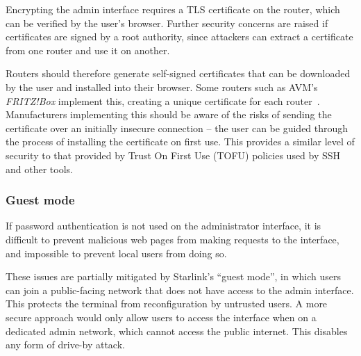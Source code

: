 Encrypting the admin interface requires a TLS certificate on the router, which can be verified by the user's browser.
Further security concerns are raised if certificates are signed by a root authority, since attackers can extract a certificate from one router and use it on another.

Routers should therefore generate self-signed certificates that can be downloaded by the user and installed into their browser.
Some routers such as AVM's \textit{FRITZ!Box} implement this, creating a unique certificate for each router~\cite{fritzbox_cert}.
Manufacturers implementing this should be aware of the risks of sending the certificate over an initially insecure connection -- the user can be guided through the process of installing the certificate on first use.
This provides a similar level of security to that provided by Trust On First Use (TOFU) policies used by SSH and other tools.

\subsubsection{Guest mode}

If password authentication is not used on the administrator interface, it is difficult to prevent malicious web pages from making requests to the interface, and impossible to prevent local users from doing so.

These issues are partially mitigated by Starlink's ``guest mode'', in which users can join a public-facing network that does not have access to the admin interface.
This protects the terminal from reconfiguration by untrusted users.
A more secure approach would only allow users to access the interface when on a dedicated admin network, which cannot access the public internet.
This disables any form of drive-by attack.

